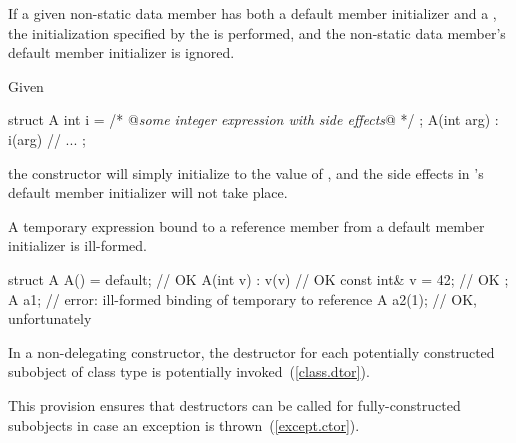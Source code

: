 \pnum
If a given non-static data member has both a default member initializer
and a , the initialization specified by the
 is performed, and the non-static data member's 
default member initializer is ignored.
\begin{example} Given
\begin{codeblock}
struct A {
  int i = /* @\textrm{\textit{some integer expression with side effects}}@ */ ;
  A(int arg) : i(arg) { }
  // ...
};
\end{codeblock}

the  constructor will simply initialize  to the value of
, and the
%
side effects in 's default member initializer 
will not take place.
\end{example}

\pnum
A temporary expression bound to a reference member from a
default member initializer is ill-formed.
\begin{example}
\begin{codeblock}
struct A {
  A() = default;        // OK
  A(int v) : v(v) { }   // OK
  const int& v = 42;    // OK
};
A a1;                   // error: ill-formed binding of temporary to reference
A a2(1);                // OK, unfortunately
\end{codeblock}
\end{example}

\pnum
In a non-delegating constructor, the destructor for each potentially constructed
subobject of class type is potentially invoked~(\ref{class.dtor}).
\begin{note} This provision ensures that destructors can be called for fully-constructed
subobjects in case an exception is thrown~(\ref{except.ctor}). \end{note}

